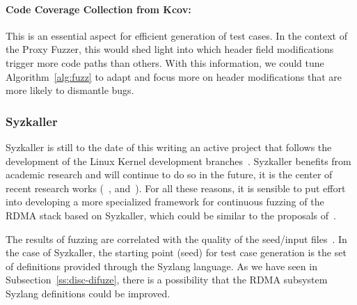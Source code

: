 \paragraph{Code Coverage Collection from Kcov:} This is an essential aspect for efficient generation of test cases.
In the context of the Proxy Fuzzer, this would shed light into which header field modifications trigger more
code paths than others. With this information, we could tune Algorithm~\ref{alg:fuzz} to adapt and focus
more on header modifications that are more likely to dismantle bugs.

\subsubsection{Syzkaller}

Syzkaller is still to the date of this writing an active project that follows the development of the Linux Kernel development
branches~\cite{shiIndustryPracticeCoverageguided2019}. Syzkaller benefits from academic
research and will continue to do so in the future, it is the center of recent research works
(~\cite{kim2020hfl},\cite{hongNovelDynamicAnalysis2021} and~\cite{pailoorMoonShineOptimizingOS2018}).
For all these reasons, it is sensible to put effort into developing a more specialized framework for continuous fuzzing
of the RDMA stack based on Syzkaller, which could be similar to the proposals of~\cite{shiIndustryPracticeCoverageguided2019}.


The results of fuzzing are correlated with the quality of the seed/input files~\cite{liangFuzzingStateArt2018}.
In the case of Syzkaller, the starting point (seed) for test case generation is the set of definitions
provided through the Syzlang language. As we have seen in Subsection~\ref{ss:disc-difuze}, there is
a possibility that the RDMA subsystem Syzlang definitions could be improved.

